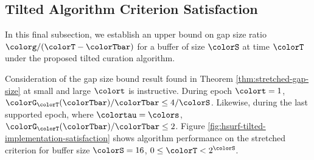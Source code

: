 \subsection{Tilted Algorithm Criterion Satisfaction}
\label{sec:tilted-satisfaction}

In this final subsection, we establish an upper bound on gap size ratio $\colorg/(\colorT - \colorTbar)$ for a buffer of size $\colorS$ at time $\colorT$ under the proposed tilted curation algorithm.



Consideration of the gap size bound result found in Theorem \ref{thm:stretched-gap-size} at small and large $\colort$ is instructive.
During epoch $\colort = 1$, $\colorG_{\colorT}(\colorTbar)/\colorTbar \leq 4/\colorS$.
Likewise, during the last supported epoch, where $\colortau = \colors$, $\colorG_{\colorT}(\colorTbar)/\colorTbar \leq 2$.
Figure \ref{fig:hsurf-tilted-implementation-satisfaction} shows algorithm performance on the stretched criterion for buffer size $\colorS=16$, $0 \leq \colorT < 2^{\colorS}$.
